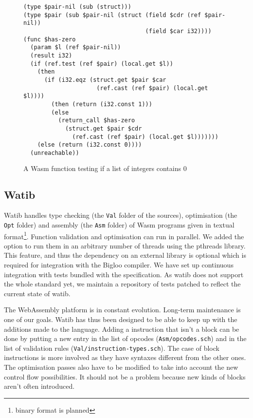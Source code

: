 \documentclass[a4paper,11pt]{article}
\begin{document}
\begin{figure}[h]
  \begin{minipage}{\widthof{(type \$pair (sub \$pair-nil (struct (field \$cdr (ref \$pair-nil))}}
\begin{lstlisting}
(type $pair-nil (sub (struct)))
(type $pair (sub $pair-nil (struct (field $cdr (ref $pair-nil))
                                   (field $car i32))))
(func $has-zero
  (param $l (ref $pair-nil))
  (result i32)
  (if (ref.test (ref $pair) (local.get $l))
    (then
      (if (i32.eqz (struct.get $pair $car
                     (ref.cast (ref $pair) (local.get $l))))
        (then (return (i32.const 1)))
        (else
          (return_call $has-zero
            (struct.get $pair $cdr
              (ref.cast (ref $pair) (local.get $l)))))))
    (else (return (i32.const 0))))
  (unreachable))
\end{lstlisting}
  \end{minipage}

  \caption{A Wasm function testing if a list of integers contains 0}\label{ex}
\end{figure}

\subsection{Watib}
\textsf{Watib} handles type checking (the \texttt{Val} folder of the sources),
optimisation (the \texttt{Opt} folder) and assembly (the \texttt{Asm} folder) of
Wasm programs given in textual format\footnote{binary format is planned}.
Function validation and optimisation can run in parallel. We added the option to
run them in an arbitrary number of threads using the \textsf{pthreads} library.
This feature, and thus the dependency on an external library is optional which
is required for integration with the Bigloo compiler. We have set up continuous
integration with tests bundled with the specification. As \textsf{watib} does
not support the whole standard yet, we maintain a repository of tests patched to
reflect the current state of \textsf{watib}.

The WebAssembly platform is in constant evolution. Long-term maintenance is one
of our goals. \textsf{Watib} has thus been designed to be able to keep up with
the additions made to the language. Adding a instruction that isn't a block can
be done by putting a new entry in the list of opcodes (\texttt{Asm/opcodes.sch})
and in the list of validation rules (\texttt{Val/instruction-types.sch}). The
case of block instructions is more involved as they have syntaxes different from
the other ones. The optimisation passes also have to be modified to take into
account the new control flow possibilities. It should not be a problem because
new kinds of blocks aren't often introduced.
\end{document}
